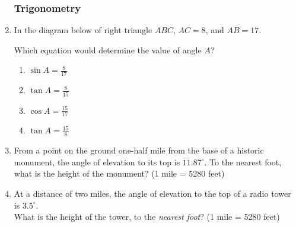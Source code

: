 \documentclass[12pt, oneside]{article}
\begin{document}
\begin{enumerate}[itemsep=0cm]
\subsubsection*{Trigonometry}
\item In the diagram below of right triangle $ABC$, $AC=8$, and $AB=17$.
  \begin{center}
  \end{center}
Which equation would determine the value of angle $A$?
  \begin{multicols}{2}
    \begin{enumerate}
      \item $\displaystyle \sin A = \frac{8}{17}$
      \item $\displaystyle \tan A = \frac{8}{15}$
      \item $\displaystyle \cos A = \frac{15}{17}$
      \item $\displaystyle \tan A = \frac{15}{8}$
    \end{enumerate}
  \end{multicols}

\item From a point on the ground one-half mile from the base of a historic monument, the angle of elevation to its top is $11.87^\circ$. To the nearest foot, what is the height of the monument? (1 mile = 5280 feet)

\item At a distance of two miles, the angle of elevation to the top of a radio tower is $3.5^\circ$. \\[0.25cm]
What is the height of the tower, to the \emph{nearest foot}? (1 mile = 5280 feet)
  \begin{center}
  \end{center}


\end{enumerate}
\end{document}
